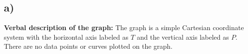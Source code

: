 

\subsection*{a)}

\textbf{Verbal description of the graph:} The graph is a simple Cartesian coordinate system with the horizontal axis labeled as \( T \) and the vertical axis labeled as \( P \). There are no data points or curves plotted on the graph.
